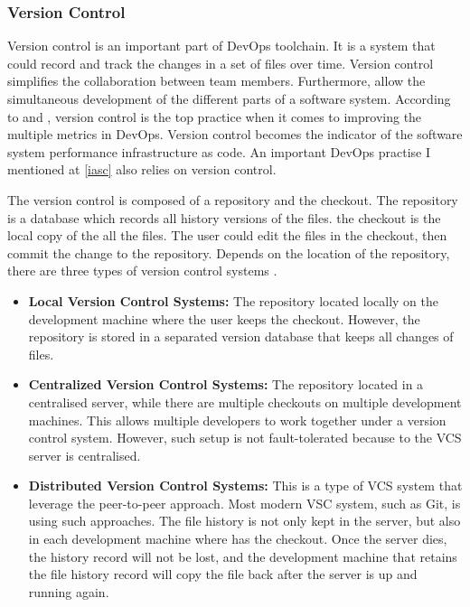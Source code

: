\subsubsection{Version Control}
Version control is an important part of DevOps toolchain. It is a system that could record and track the changes in a set of files over time. Version control simplifies the collaboration between team members. Furthermore, allow the simultaneous development of the different parts of a software system. According to \cite{Sourcean53:online} and \cite{velasquez2014state}, version control is the top practice when it comes to improving the multiple metrics in DevOps. Version control becomes the indicator of the software system performance \cite{Sourcean53:online} infrastructure as code. An important DevOps practise I mentioned at \ref{iasc} also relies on version control.
\par
The version control is composed of a repository and the checkout. The repository is a database which records all history versions of the files. the checkout is the local copy of the all the files. The user could edit the files in the checkout, then commit the change to the repository. Depends on the location of the repository, there are three types of version control systems \cite{VCS}.
\begin{itemize}
    \item \textbf{Local Version Control Systems:} The repository located locally on the development machine where the user keeps the checkout. However, the repository is stored in a separated version database that keeps all changes of files. 
    \item \textbf{Centralized Version Control Systems:} The repository located in a centralised server, while there are multiple checkouts on multiple development machines. This allows multiple developers to work together under a version control system. However, such setup is not fault-tolerated because to the VCS server is centralised.
    \item \textbf{Distributed Version Control Systems:} This is a type of VCS system that leverage the peer-to-peer approach. Most modern VSC system, such as Git, is using such approaches. The file history is not only kept in the server, but also in each development machine where has the checkout. Once the server dies, the history record will not be lost, and the development machine that retains the file history record will copy the file back after the server is up and running again.
\end{itemize}
